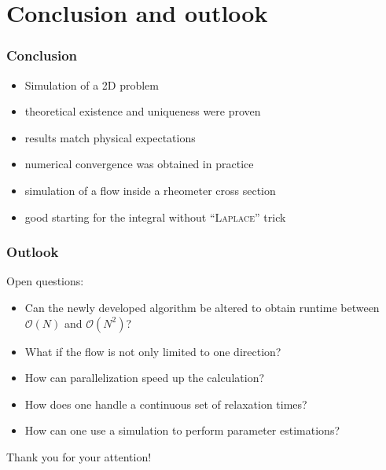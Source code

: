\documentclass[12pt,a4paper,handout]{beamer}
\theoremstyle{definition}
\theoremstyle{plain}
\begin{document}
\section{Conclusion and outlook}
\begin{frame}
    \frametitle{Conclusion}
    \begin{itemize}[<+->]
        \item Simulation of a 2D problem 
        \item theoretical existence and uniqueness were proven
        \item results match physical expectations
        \item numerical convergence was obtained in practice
        \item simulation of a flow inside a rheometer cross section
        \item good starting for the integral without \enquote{\textsc{Laplace}} trick
    \end{itemize}
\end{frame}
\begin{frame}
    \frametitle{Outlook}
    Open questions:
    \begin{itemize}[<+->]
          \item Can the newly developed algorithm be altered to obtain runtime between $\mathcal{O}(N)$ and $\mathcal{O}(N^2)$?
          \item What if the flow is not only limited to one direction? 
          \item How can parallelization speed up the calculation? 
          \item How does one handle a continuous set of relaxation times?
          \item How can one use a simulation to perform parameter estimations?     
    \end{itemize}
\end{frame}
\begin{frame}
\huge{Thank you for your attention!}
\end{frame}
\end{document}
